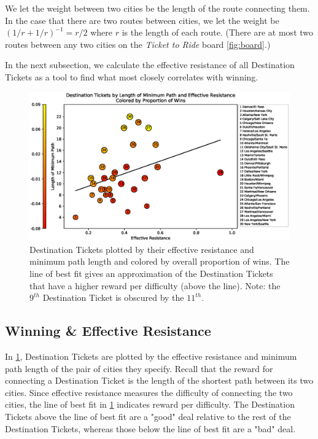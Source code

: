 We let the weight between two cities be the length
of the route connecting them.
In the case that there are two routes between cities,
we let the weight be $(1/r + 1/r)^{-1}=r/2$ where
$r$ is the length of each route.
(There are at most two routes between any two cities
on the \textit{Ticket to Ride} board \cref{fig:board}.)

In the next subsection, we calculate the effective
resistance of all Destination Tickets as a tool
to find what most closely correlates with winning.

\begin{figure}[h]
    \centering
    \includegraphics[scale=.6]{figures/resistance_aggregate}
    \caption{Destination Tickets plotted by their effective
    resistance and minimum path length and colored
    by overall proportion of wins.
    The line of best fit gives an approximation of the
    Destination Tickets that have a higher reward per difficulty
    (above the line).
    Note: the $9^{th}$ Destination Ticket 
    is obscured by the $11^{th}$.}
    \label{fig:resistance}
\end{figure}

\subsection{Winning \& Effective Resistance}

In \cref{fig:resistance},
Destination Tickets are plotted by 
the effective resistance 
and minimum path length of the pair of cities they specify.
Recall that the reward for connecting a Destination Ticket
is the length of the shortest path between its two cities.
Since effective resistance measures the difficulty of
connecting the two cities, the line of best fit in \cref{fig:resistance}
indicates reward per difficulty.
The Destination Tickets above the line of best fit are
a "good" deal relative to the rest of the Destination Tickets,
whereas those below the line of best fit are a "bad" deal.

